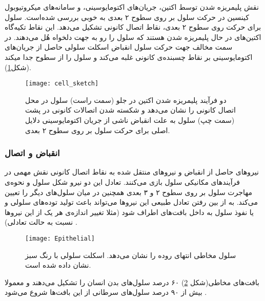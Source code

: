 نقش پلیمریزه شدن توسط اکتین، جریان‌های اکتومایوسینی، و سامانه‌های میکروتیوبول کینسین در حرکت سلول بر روی سطوح ۲ بعدی به خوبی بررسی شده‌است\cite{PhysRevLett.92.078101, refId0, PhysRevE.76.031921}. سلول برای حرکت روی سطوح ۲ بعدی، نقاط اتصال کانونی تشکیل می‌دهد. این نقاط تکیه‌گاه اکتین‌های در حال پلیمریزه شدن هستند که سلول را رو به جهت دلخواه هُل می‌دهند. در سمت مخالف جهت حرکت سلول انقباض اسکلت سلولی حاصل از جریان‌های اکتومایوسینی بر نقاط چسبنده‌ی کانونی غلبه می‌کند و سلول را از سطوح جدا میکند\cite{Hawkins:2011eu} (شکل\ref{fig:migration}).
\begin{figure}[htbp]
\begin{center}
\texttt{[image: cell\_sketch]}
\caption{
دو فرآیند پلیمریزه‌ شدن اکتین در جلو (سمت راست) سلول در محل اتصال کانونی را نشان می‌دهد و شکسته شدن اتصالات کانونی در پشت (سمت چپ) سلول به علت انقباض ناشی از جریان اکتومایوسینی دلایل اصلی برای حرکت سلول بر روی سطوح ۲ بعدی.
}
\label{fig:migration}
\end{center}
\end{figure}


\subsubsection{انقباض و اتصال}\label{lab:traction}
نیروهای حاصل از انقباض و نیروهای منتقل شده به نقاط اتصال کانونی نقش مهمی در فرآیندهای مکانیکی سلول بازی می‌کنند. تعادل این دو نیرو شکل سلول و نحوه‌ی مهاجرت سلول بر روی سطوح ۲ و ۳ بعدی همچنین در میان سلول‌های دیگر را تعیین می‌کند. به از بین رفتن تعادل طبیعی این نیروها می‌تواند باعث تولید توده‌های سلولی و یا نفوذ سلول به داخل بافت‌های اطراف شود (مثلا تغییر اندازه‌ی هر یک از این نیروها نسبت به حالت تعادلی)  \cite{doi:10.1080/19336918.2015.1008329}.






\begin{figure}[htbp]
\begin{center}
\texttt{[image: Epithelial]}
\caption{
سلول مخاطی انتهای روده را نشان می‌دهد. اسکلت سلولی با رنگ سبز نشان داده شده است.\cite{10.1371/journal.pone.0030247}
}
\label{fig:Epithelial}
\end{center}
\end{figure}
بافت‌های مخاطی(شکل \ref{fig:Epithelial}) ۶۰ درصد سلول‌های بدن انسان را تشکیل می‌دهند و معمولا بیش از ۹۰ درصد سلول‌های سرطانی از این بافت‌ها شروع می‌شود \cite{doi:10.1080/19336918.2015.1008329}.

